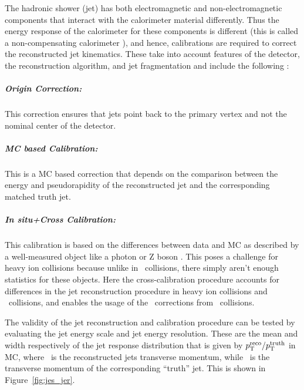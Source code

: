 
The hadronic shower (jet) has both electromagnetic and non-electromagnetic components that interact with the calorimeter material differently.
Thus the energy response of the calorimeter for these components is different (this is called a non-compensating calorimeter \cite{calorimetry_book}), and hence, calibrations are required to correct the reconstructed jet kinematics.
These take into account features of the detector, the reconstruction algorithm, and jet fragmentation and include the following \cite{Aad:2014bia}:
\subparagraph{Origin Correction: } This correction ensures that jets point back to the primary vertex and not the nominal center of the detector.
\subparagraph{MC based Calibration: } This is a MC based correction that depends on the comparison between the energy and pseudorapidity of the reconstructed jet and the corresponding matched truth jet.
\subparagraph{\textit{In situ}+Cross Calibration: } This calibration is based on the differences between data and MC as described by a well-measured object like a photon or Z boson \cite{cc2015, HIjesnote}.
This poses a challenge for heavy ion collisions because unlike in \pp\ collisions, there simply aren't enough statistics for these objects.
Here the cross-calibration procedure accounts for differences in the jet reconstruction procedure in heavy ion collisions and \pp\ collisions, and enables the usage of the \insitu\ corrections from \pp\ collisions.

The validity of the jet reconstruction and calibration procedure can be tested by evaluating the jet energy scale and jet energy resolution.
These are the mean and width respectively of the jet response distribution that is given by $\mbox{$p_{\mathrm{T}}^{\mathrm{reco}}$} / \mbox{$p_{\mathrm{T}}^{\mathrm{truth}}$}$ in MC, where \ptreco\ is the reconstructed jets transverse momentum, while \pttruth\ is the transverse momentum of the corresponding ``truth'' jet.
This is shown in Figure~\ref{fig:jes_jer}.


